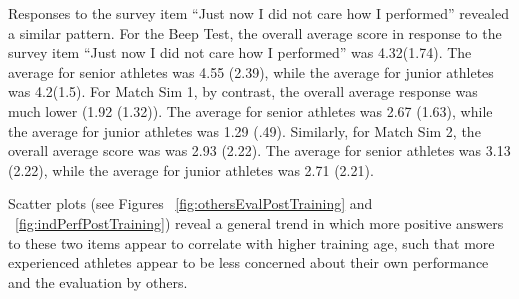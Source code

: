 \begin{CJK}{UTF8}{gbsn}
Responses to the survey item ``Just now I did not care how I performed'' revealed a similar pattern.  For the Beep Test, the overall average score in response to the survey item ``Just now I did not care how I performed'' was 4.32(1.74). The average for senior athletes was 4.55 (2.39), while the average for junior athletes was 4.2(1.5).  For Match Sim 1, by contrast, the overall average response was much lower (1.92 (1.32)).  The average for senior athletes was 2.67 (1.63), while the average for junior athletes was 1.29 (.49). Similarly, for Match Sim 2, the overall average score was was 2.93 (2.22).  The average for senior athletes was 3.13 (2.22), while the average for junior athletes was 2.71 (2.21).



Scatter plots (see Figures ~\ref{fig:othersEvalPostTraining} and ~\ref{fig:indPerfPostTraining}) reveal a general trend in which more positive answers to these two items appear to correlate with higher training age, such that more experienced athletes appear to be less concerned about their own performance and the evaluation by others.




\end{CJK}
